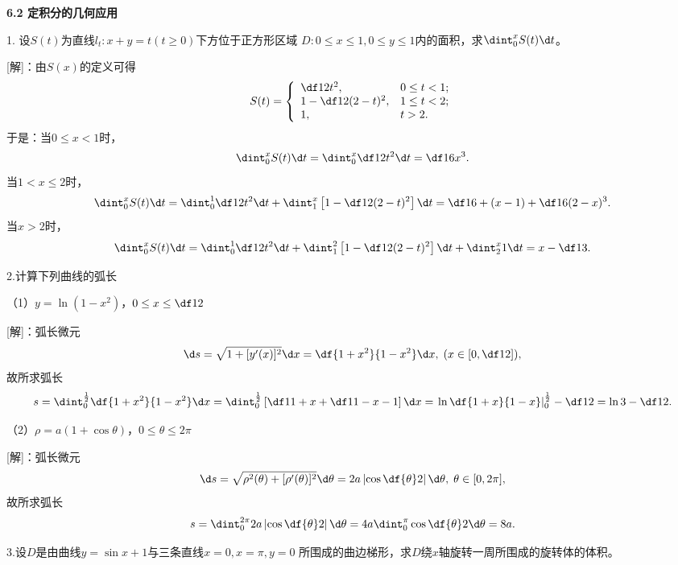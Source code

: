 \begin{center}
	\bf 6.2 定积分的几何应用
\end{center}

\bs

1. 设$S(t)$为直线$l_t:x+y=t(t\geq0)$下方位于正方形区域
$D:0\leq x\leq 1,0\leq y\leq 1$内的面积，求$\dint_0^xS(t)\d t$。

[解]：由$S(x)$的定义可得
$$S(t)=\left\{\begin{array}{ll}
	\df12t^2,& 0\leq t<1;\\ 1-\df12(2-t)^2, & 1\leq t <2;\\
	1,& t>2. 
\end{array}\right.$$
于是：当$0\leq x<1$时，
$$\dint_0^xS(t)\d t=\dint_0^x\df12t^2\d t=\df16x^3.$$
当$1<x\leq2$时，
$$\dint_0^xS(t)\d t=\dint_0^1\df12t^2\d t
+\dint_1^x\left[1-\df12(2-t)^2\right]\d t
=\df16+(x-1)+\df16(2-x)^3.$$
当$x>2$时，
$$\dint_0^xS(t)\d t=\dint_0^1\df12t^2\d t
+\dint_1^2\left[1-\df12(2-t)^2\right]\d t
+\dint_2^x1\d t
=x-\df13.$$
\fin

\bs

2.计算下列曲线的弧长

（1）$y=\ln(1-x^2)$，$0\leq x\leq\df12$

[解]：弧长微元
$$\d s=\sqrt{1+[y'(x)]^2}\d x=\df{1+x^2}{1-x^2}\d
x,\;(x\in\left[0,\df12\right]),$$
故所求弧长
$$s=\dint_0^{\frac12}\df{1+x^2}{1-x^2}\d x
=\dint_0^{\frac12}\left[\df1{1+x}+\df1{1-x}-1\right]\d x
=\left.\ln\df{1+x}{1-x}\right|_0^{\frac12}-\df12
=\ln3-\df12.$$

（2）$\rho=a(1+\cos\theta)$，$0\leq\theta\leq2\pi$

[解]：弧长微元
$$\d s=\sqrt{\rho^2(\theta)+[\rho'(\theta)]^2}\d\theta
=2a\left|\cos\df{\theta}2\right|\d\theta,\;\theta\in[0,2\pi],$$
故所求弧长
$$s=\dint_0^{2\pi}2a\left|\cos\df{\theta}2\right|\d\theta
=4a\dint_0^{\pi}\cos\df{\theta}2\d\theta
=8a.$$
\fin

\bs

3.设$D$是由曲线$y=\sin x+1$与三条直线$x=0,x=\pi,y=0$
所围成的曲边梯形，求$D$绕$x$轴旋转一周所围成的旋转体的体积。

